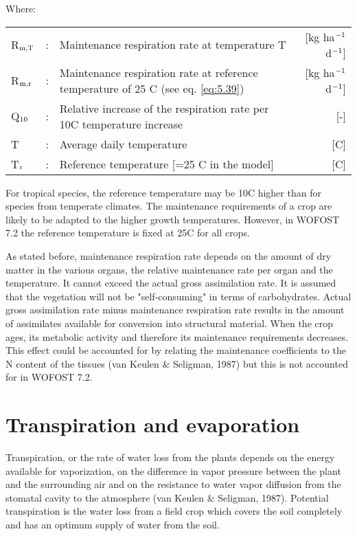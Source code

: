 Where:\\[5pt]
\begin{tabularx}{\textwidth}{llXr}
	R$_{{\rm m,T}}$ &:& Maintenance respiration rate at 
	temperature T &    [kg ha$^{{\rm -1}}$ d$^{{\rm -1}}$]\\
	R$_{{\rm m,r}}$ &:& Maintenance respiration rate at reference 
	temperature of 25 \textdegree C (see eq. \ref{eq:5.39})   &     [kg ha$^{{\rm -1}}$ d$^{{\rm -1}}$]\\
	Q$_{{\rm 10}}$ &:& Relative increase of the respiration rate
	per 10\textdegree C temperature increase    &    [-]\\
	T &:& Average daily temperature    &     [\textdegree C]\\
	T$_{{\rm r}}$ &:& Reference temperature {\small [=25 \textdegree C in 
		the model]}    &    [\textdegree C]\\
\end{tabularx}


For tropical species, the reference temperature may be 10\textdegree C higher than for species from
temperate climates. The maintenance requirements of a crop are likely to be adapted to
the higher growth temperatures. However, in WOFOST 7.2 the reference temperature is
fixed at 25\textdegree C for all crops.

As stated before, maintenance respiration rate depends on the amount of dry matter in the
various organs, the relative maintenance rate per organ and the temperature. It cannot
exceed the actual gross assimilation rate. It is assumed that the vegetation will not be
"self-consuming" in terms of carbohydrates. Actual gross assimilation rate minus 
maintenance respiration rate results in the amount of assimilates available for conversion into
structural material. When the crop ages, its metabolic activity and therefore its
maintenance requirements decreases. This effect could be accounted for by relating 
the maintenance coefficients to the N content of the tissues (van Keulen \& Seligman, 1987)
but this is not accounted for in WOFOST 7.2.


\section{Transpiration and evaporation}
\label{sec:evapotranspiration}

Transpiration, or the rate of water loss from the plants depends on the energy available
for vaporization, on the difference in vapor pressure between the plant and the surrounding 
air and on the resistance to water vapor diffusion from the stomatal cavity to the
atmosphere (van Keulen \& Seligman, 1987). Potential transpiration is the water loss from
a field crop which covers the soil completely and has an optimum supply of water from
the soil. 

